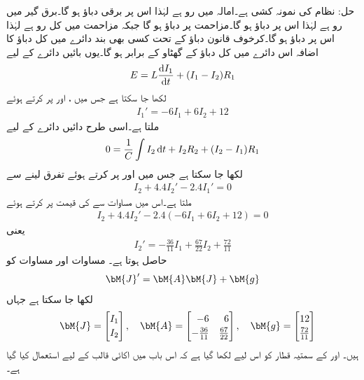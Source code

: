 حل: نظام کی نمونہ کشی ہے۔امالہ میں رو  ہے لہٰذا اس پر برقی دباؤ  ہو گا۔برق گیر میں رو  ہے لہٰذا اس پر دباؤ  ہو گا۔مزاحمت  پر دباؤ  ہو گا جبکہ مزاحمت  میں کل رو  ہے لہٰذا اس پر دباؤ  ہو گا۔کرخوف قانون دباؤ کے تحت کسی بھی بند دائرے میں کل دباؤ کا اضافہ اس دائرے میں کل دباؤ کے گھٹاو کے برابر ہو گا۔یوں بائیں دائرے کے لیے
\begin{align*}
E=L\frac{\dif I_1}{\dif t}+(I_1-I_2)R_1
\end{align*}
لکھا جا سکتا ہے جس میں ،  اور  پر کرتے ہوئے
\begin{align}\label{مساوات_مثال_برقی_جال_الف}
I_1'=-6I_1+6I_2+12
\end{align}
ملتا ہے۔اسی طرح دائیں دائرے کے لیے
\begin{align*}
0=\frac{1}{C}\int I_2 \dif t+I_2R_2+(I_2-I_1)R_1
\end{align*}
لکھا جا سکتا ہے جس میں  اور  پر کرتے ہوئے تفرق لینے سے
\begin{align*}
I_2+4.4I_2'-2.4I_1'=0
\end{align*}
ملتا ہے۔اس میں مساوات  سے  کی قیمت پر کرتے ہوئے
\begin{align*}
I_2+4.4I_2'-2.4(-6I_1+6I_2+12)=0
\end{align*}
یعنی
\begin{align}\label{مساوات_مثال_برقی_جال_ب}
I_2'=-\frac{36}{11}I_1+\frac{67}{22}I_2+\frac{72}{11}
\end{align}
حاصل ہوتا ہے۔ مساوات  اور مساوات  کو 
\begin{align}\label{مساوات_نظام_برقی_غیر-متجانس_الف}
\bM{J}'=\bM{A} \bM{J}+\bM{g} 
\end{align}
لکھا جا سکتا ہے جہاں 
\begin{align*}
\quad \bM{J}=\begin{bmatrix*}[r] I_1 \\[0.5ex] I_2 \end{bmatrix*},\quad \bM{A}=\begin{bmatrix*}[r] -6 & 6\\[0.5ex] -\frac{36}{11}& \frac{67}{22} \end{bmatrix*}, \quad  \bM{g}=\begin{bmatrix*}[r] 12 \\[0.5ex] \frac{72}{11} \end{bmatrix*}
\end{align*}
ہیں۔ اور  کے  سمتیہ قطار کو  اس لیے لکھا گیا ہے کہ اس باب میں  اکائی قالب کے لیے استعمال کیا گیا ہے۔ 

